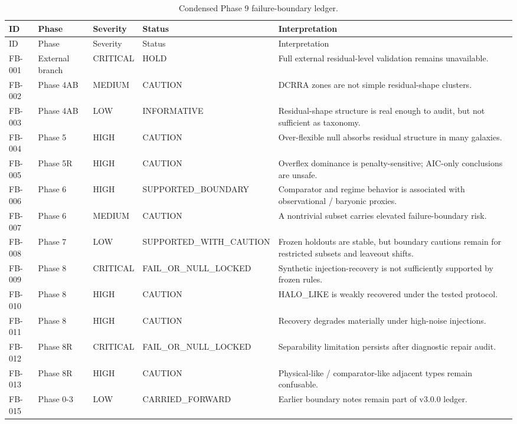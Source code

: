 \documentclass[11pt]{article}
\begin{document}
\begin{longtable}{llllp{6.1cm}}
\caption{Condensed Phase 9 failure-boundary ledger.}\\
\toprule
ID & Phase & Severity & Status & Interpretation \\
\midrule
\endfirsthead
\toprule
ID & Phase & Severity & Status & Interpretation \\
\midrule
\endhead
FB-001 & External branch & CRITICAL & HOLD & Full external residual-level validation remains unavailable. \\
FB-002 & Phase 4AB & MEDIUM & CAUTION & DCRRA zones are not simple residual-shape clusters. \\
FB-003 & Phase 4AB & LOW & INFORMATIVE & Residual-shape structure is real enough to audit, but not sufficient as taxonomy. \\
FB-004 & Phase 5 & HIGH & CAUTION & Over-flexible null absorbs residual structure in many galaxies. \\
FB-005 & Phase 5R & HIGH & CAUTION & Overflex dominance is penalty-sensitive; AIC-only conclusions are unsafe. \\
FB-006 & Phase 6 & HIGH & SUPPORTED\_BOUNDARY & Comparator and regime behavior is associated with observational / baryonic proxies. \\
FB-007 & Phase 6 & MEDIUM & CAUTION & A nontrivial subset carries elevated failure-boundary risk. \\
FB-008 & Phase 7 & LOW & SUPPORTED\_WITH\_CAUTION & Frozen holdouts are stable, but boundary cautions remain for restricted subsets and leaveout shifts. \\
FB-009 & Phase 8 & CRITICAL & FAIL\_OR\_NULL\_LOCKED & Synthetic injection-recovery is not sufficiently supported by frozen rules. \\
FB-010 & Phase 8 & HIGH & CAUTION & HALO\_LIKE is weakly recovered under the tested protocol. \\
FB-011 & Phase 8 & HIGH & CAUTION & Recovery degrades materially under high-noise injections. \\
FB-012 & Phase 8R & CRITICAL & FAIL\_OR\_NULL\_LOCKED & Separability limitation persists after diagnostic repair audit. \\
FB-013 & Phase 8R & HIGH & CAUTION & Physical-like / comparator-like adjacent types remain confusable. \\
FB-015 & Phase 0-3 & LOW & CARRIED\_FORWARD & Earlier boundary notes remain part of v3.0.0 ledger. \\
\bottomrule
\end{longtable}
\end{document}
